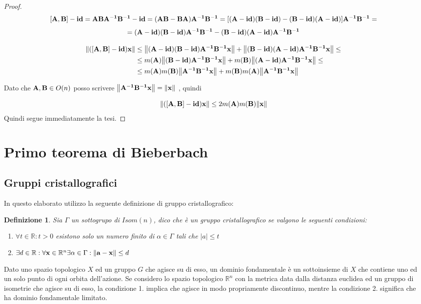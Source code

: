 \documentclass[10pt,a4paper]{article}
\newtheorem{definition}{Definizione}[section]
\begin{document}
\begin{proof}



\[ [\vb{A,B}] - \vb{id} = \vb{ABA^{-1}B^{-1} - id }= \vb{(AB -BA)A^{-1}B^{-1} }= [ \vb{ (A-id)(B-id) - (B-id)(A-id)}] \vb{A^{-1}B^{-1}} = \]
 \[  = \vb{( A-id)(B-id) A^{-1}B^{-1} -  (B-id)(A-id) A^{-1}B^{-1}} \]
 
 
 \begin{equation} 
\begin{split}
\norm{\vb{([A,B] - id )x}} & \leq \norm{\vb{ ( A-id)(B-id) A^{-1}B^{-1}x}} +  \norm{\vb{(B-id)(A-id) A^{-1}B^{-1}x}} \leq \\
& \leq m(\vb{A}) \norm{\vb{(B-id) A^{-1}B^{-1}x}} + m(\vb{B}) \norm{\vb{(A-id) A^{-1}B^{-1}x}} \leq \\ 
& \leq m(\vb{A})m(\vb{B})\norm{\vb{A^{-1}B^{-1}x}} + m(\vb{B})m(\vb{A}) \norm{\vb{A^{-1}B^{-1}x}}
\end{split}
\end{equation}

Dato che $ \vb{A,B} \in O(n)$ posso scrivere $\norm{\vb{A^{-1}B^{-1}x}} = \norm{\vb{x}} $ , quindi 

\begin{equation}
  \norm{\vb{([A,B] - id )x}}  \leq 2m(\vb{A})m(\vb{B})\norm{\vb{x}}
\end{equation} 
Quindi segue immediatamente la tesi. 
\end{proof}
\pagebreak
\section{Primo teorema di Bieberbach}
\subsection{Gruppi cristallografici}
In questo elaborato utilizzo la seguente definizione di gruppo cristallografico:
\begin{definition}
Sia $\Gamma$ un sottogrupo di $Isom(n)$, dico che è un gruppo cristallografico se valgono le seguenti condizioni:
\begin{enumerate}
	\item $ \forall t \in \mathbb{R} : t > 0 $  esistono solo un numero finito di $\alpha \in \Gamma $  tali che  $|a| \leq t$

	\item $ \exists d \in \mathbb{R}: \forall \vb{x} \in \mathbb{R}^n   \exists \alpha \in \Gamma : \norm{\vb{a-x}}\leq d $
\end{enumerate}
\end{definition}
Dato uno spazio topologico $X$ ed un gruppo $G$ che agisce su di esso, un dominio fondamentale è un sottoinsieme di $X$ che contiene uno ed un solo punto di ogni orbita dell'azione. Se considero lo spazio topologico $\mathbb{R}^n$ con la metrica data dalla distanza euclidea ed un gruppo di isometrie che agisce su di esso, la condizione 1. implica che agisce in modo propriamente discontinuo, mentre la condizione 2. significa che ha dominio fondamentale limitato. 
\end{document}
